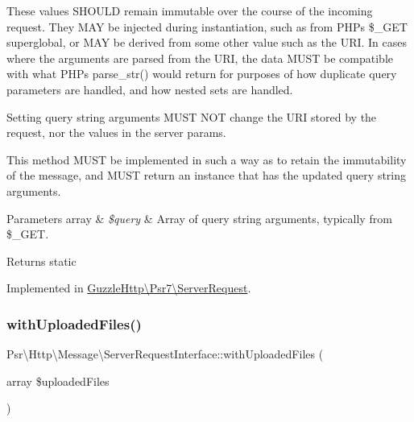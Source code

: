 These values S\+H\+O\+U\+LD remain immutable over the course of the incoming request. They M\+AY be injected during instantiation, such as from P\+HP\textquotesingle{}s \$\+\_\+\+G\+ET superglobal, or M\+AY be derived from some other value such as the U\+RI. In cases where the arguments are parsed from the U\+RI, the data M\+U\+ST be compatible with what P\+HP\textquotesingle{}s parse\+\_\+str() would return for purposes of how duplicate query parameters are handled, and how nested sets are handled.

Setting query string arguments M\+U\+ST N\+OT change the U\+RI stored by the request, nor the values in the server params.

This method M\+U\+ST be implemented in such a way as to retain the immutability of the message, and M\+U\+ST return an instance that has the updated query string arguments.


\begin{DoxyParams}[1]{Parameters}
array & {\em \$query} & Array of query string arguments, typically from \$\+\_\+\+G\+ET. \\
\hline
\end{DoxyParams}
\begin{DoxyReturn}{Returns}
static 
\end{DoxyReturn}


Implemented in \hyperlink{classGuzzleHttp_1_1Psr7_1_1ServerRequest_aba139e3a3df11236f0ee70c1571dbf4a}{Guzzle\+Http\textbackslash{}\+Psr7\textbackslash{}\+Server\+Request}.

\mbox{\label{interfacePsr_1_1Http_1_1Message_1_1ServerRequestInterface_aeab9588f1afa2cdccd04671260ecaec8}} 
\subsubsection{\texorpdfstring{with\+Uploaded\+Files()}{withUploadedFiles()}}
{\footnotesize\ttfamily Psr\textbackslash{}\+Http\textbackslash{}\+Message\textbackslash{}\+Server\+Request\+Interface\+::with\+Uploaded\+Files (\begin{DoxyParamCaption}\item[{array}]{\$uploaded\+Files }\end{DoxyParamCaption})}

